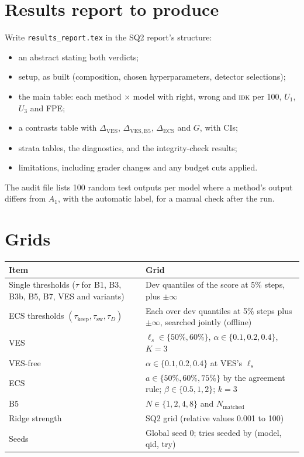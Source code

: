\documentclass[11pt]{article}
\newcommand{\IDK}{\textsc{idk}}
\begin{document}
\section{Results report to produce}
Write \texttt{results\_report.tex} in the SQ2 report's structure:
\begin{itemize}
  \item an abstract stating both verdicts;
  \item setup, as built (composition, chosen hyperparameters, detector selections);
  \item the main table: each method $\times$ model with right, wrong and \IDK{} per 100, $U_1$, $U_3$ and FPE;
  \item a contrasts table with $\Delta_{\mathrm{VES}}$, $\Delta_{\mathrm{VES,B5}}$, $\Delta_{\mathrm{ECS}}$ and $G$,
        with CIs;
  \item strata tables, the diagnostics, and the integrity-check results;
  \item limitations, including grader changes and any budget cuts applied.
\end{itemize}
The audit file lists 100 random test outputs per model where a method's output differs from $A_1$, with the
automatic label, for a manual check after the run.

\appendix
\section{Grids}\label{app:grids}
\begin{table}[H]
\centering
\small
\begin{tabularx}{\textwidth}{@{}lL@{}}
\toprule
Item & Grid \\
\midrule
Single thresholds ($\tau$ for B1, B3, B3b, B5, B7, VES and variants) & Dev quantiles of the score at
      5\% steps, plus $\pm\infty$ \\
ECS thresholds $(\tau_{\mathrm{keep}}, \tau_{\mathrm{sw}}, \tau_D)$ & Each over dev quantiles at 5\% steps
      plus $\pm\infty$, searched jointly (offline) \\
VES & $\ell_s \in \{50\%, 60\%\}$, $\alpha \in \{0.1, 0.2, 0.4\}$, $K = 3$ \\
VES-free & $\alpha \in \{0.1, 0.2, 0.4\}$ at VES's $\ell_s$ \\
ECS & $a \in \{50\%, 60\%, 75\%\}$ by the agreement rule; $\beta \in \{0.5, 1, 2\}$; $k = 3$ \\
B5 & $N \in \{1, 2, 4, 8\}$ and $N_{\mathrm{matched}}$ \\
Ridge strength & SQ2 grid (relative values 0.001 to 100) \\
Seeds & Global seed 0; tries seeded by (model, qid, try) \\
\bottomrule
\end{tabularx}
\end{table}
\end{document}
